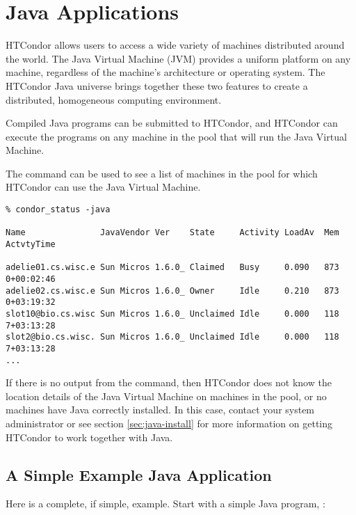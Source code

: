 
\section{\label{sec:Java}Java Applications}

HTCondor allows users to access a wide variety of
machines distributed around the world.
The Java Virtual Machine (JVM)
provides a uniform platform on any machine, regardless of the
machine's architecture or operating system.
The HTCondor Java universe brings together these
two features to create a distributed, homogeneous computing environment.

Compiled Java programs can be submitted to HTCondor, and HTCondor
can execute the programs on any machine in the pool that will run
the Java Virtual Machine.


The  command can be used to see a list of
machines in the pool for which HTCondor can use the Java Virtual
Machine.

\footnotesize
\begin{verbatim}
% condor_status -java

Name               JavaVendor Ver    State     Activity LoadAv  Mem  ActvtyTime

adelie01.cs.wisc.e Sun Micros 1.6.0_ Claimed   Busy     0.090   873  0+00:02:46
adelie02.cs.wisc.e Sun Micros 1.6.0_ Owner     Idle     0.210   873  0+03:19:32
slot10@bio.cs.wisc Sun Micros 1.6.0_ Unclaimed Idle     0.000   118  7+03:13:28
slot2@bio.cs.wisc. Sun Micros 1.6.0_ Unclaimed Idle     0.000   118  7+03:13:28
...
\end{verbatim}
\normalsize

If there is no output from the
 command,
then HTCondor does not know the location details of the Java Virtual
Machine on machines in the pool,
or no machines have Java correctly installed.
In this case,
contact your system administrator or see section \ref{sec:java-install}
for more information on getting HTCondor to work together
with Java.

\subsection{A Simple Example Java Application}

Here is a complete, if simple, example.
Start with a simple Java program, :

